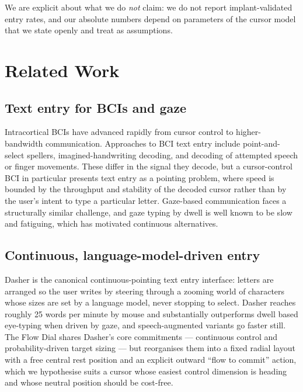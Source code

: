 \documentclass[manuscript,review,anonymous]{acmart}
\begin{document}
We are explicit about what we do \emph{not} claim: we do not report
implant-validated entry rates, and our absolute numbers depend on parameters of
the cursor model that we state openly and treat as assumptions.

\section{Related Work}
\subsection{Text entry for BCIs and gaze}
Intracortical BCIs have advanced rapidly from cursor control to higher-bandwidth
communication. Approaches to BCI text entry include point-and-select spellers,
imagined-handwriting decoding, and decoding of attempted speech or finger
movements. These differ in the signal they decode, but a cursor-control BCI in
particular presents text entry as a pointing problem, where speed is bounded by
the throughput and stability of the decoded cursor rather than by the user's
intent to type a particular letter. Gaze-based communication faces a structurally
similar challenge, and gaze typing by dwell is well known to be slow and
fatiguing, which has motivated continuous alternatives.

\subsection{Continuous, language-model-driven entry}
Dasher is the canonical continuous-pointing text entry interface: letters are
arranged so the user writes by steering through a zooming world of characters
whose sizes are set by a language model, never stopping to select. Dasher
reaches roughly 25 words per minute by mouse and substantially outperforms dwell
based eye-typing when driven by gaze, and speech-augmented variants go faster
still. The Flow Dial shares Dasher's core commitments --- continuous control and
probability-driven target sizing --- but reorganises them into a fixed radial
layout with a free central rest position and an explicit outward ``flow to
commit'' action, which we hypothesise suits a cursor whose easiest control
dimension is heading and whose neutral position should be cost-free.
\end{document}
